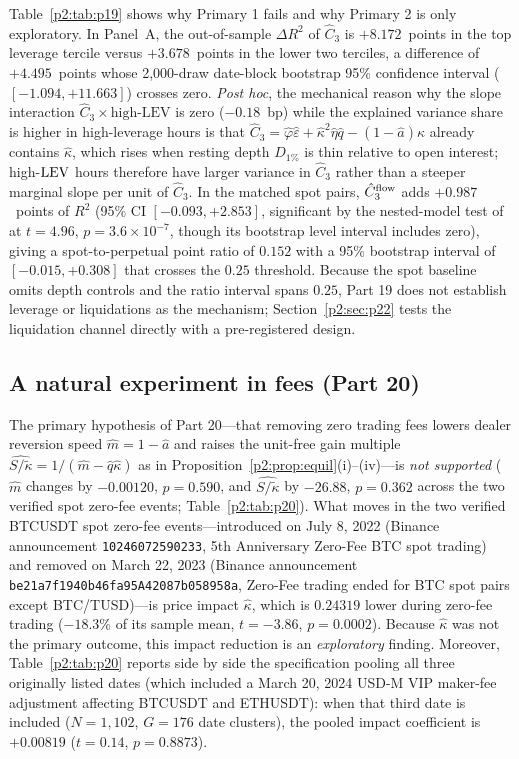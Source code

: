 Table~\ref{p2:tab:p19} shows why Primary 1 fails and why Primary 2 is only exploratory. In Panel~A, the out-of-sample $\Delta R^2$ of $\hat C_3$ is $+8.172$~points in the top leverage tercile versus $+3.678$~points in the lower two terciles, a difference of $+4.495$~points whose 2{,}000-draw date-block bootstrap 95\% confidence interval ($[-1.094,+11.663]$) crosses zero. \emph{Post hoc}, the mechanical reason why the slope interaction $\hat C_3\times\text{high-LEV}$ is zero ($-0.18$~bp) while the explained variance share is higher in high-leverage hours is that $\hat C_3=\hat\varphi\hat\varepsilon+\hat\kappa^2\hat\eta\hat q-(1-\hat a)\hat\kappa$ already contains $\hat\kappa$, which rises when resting depth $D_{1\%}$ is thin relative to open interest; high-${\rm LEV}$ hours therefore have larger variance in $\hat C_3$ rather than a steeper marginal slope per unit of $\hat C_3$. In the matched spot pairs, $\hat C_3^{\rm flow}$ adds $+0.987$~points of $R^2$ (95\% CI $[-0.093,+2.853]$, significant by the nested-model test of \citealp{p2:clark2007} at $t=4.96$, $p=3.6\times10^{-7}$, though its bootstrap level interval includes zero), giving a spot-to-perpetual point ratio of $0.152$ with a 95\% bootstrap interval of $[-0.015,+0.308]$ that crosses the $0.25$ threshold. Because the spot baseline omits depth controls and the ratio interval spans $0.25$, Part 19 does not establish leverage or liquidations as the mechanism; Section~\ref{p2:sec:p22} tests the liquidation channel directly with a pre-registered design.

\subsection{A natural experiment in fees (Part 20)}\label{p2:sec:p20}
The primary hypothesis of Part 20---that removing zero trading fees lowers dealer reversion speed $\hat m=1-\hat a$ and raises the unit-free gain multiple $\widehat{S/\tilde\kappa}=1/(\hat m-\hat q\hat\kappa)$ as in Proposition~\ref{p2:prop:equil}(i)--(iv)---is \emph{not supported} ($\hat m$ changes by $-0.00120$, $p=0.590$, and $\widehat{S/\tilde\kappa}$ by $-26.88$, $p=0.362$ across the two verified spot zero-fee events; Table~\ref{p2:tab:p20}). What moves in the two verified BTCUSDT spot zero-fee events---introduced on July 8, 2022 (Binance announcement \texttt{10246072590233}, 5th Anniversary Zero-Fee BTC spot trading) and removed on March 22, 2023 (Binance announcement \texttt{be21a7f1940b46fa95A42087b058958a}, Zero-Fee trading ended for BTC spot pairs except BTC/TUSD)---is price impact $\hat\kappa$, which is $0.24319$ lower during zero-fee trading ($-18.3\%$ of its sample mean, $t=-3.86$, $p=0.0002$). Because $\hat\kappa$ was not the primary outcome, this impact reduction is an \emph{exploratory} finding. Moreover, Table~\ref{p2:tab:p20} reports side by side the specification pooling all three originally listed dates (which included a March 20, 2024 USD-M VIP maker-fee adjustment affecting BTCUSDT and ETHUSDT): when that third date is included ($N=1{,}102$, $G=176$ date clusters), the pooled impact coefficient is $+0.00819$ ($t=0.14$, $p=0.8873$).

